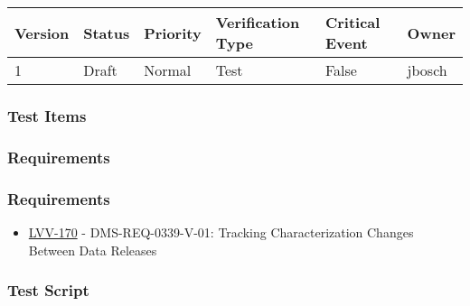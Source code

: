 \begin{longtable}[]{@{}llllll@{}}
\toprule
Version & Status & Priority & Verification Type & Critical Event &
Owner\tabularnewline
\midrule
\endhead
1 & Draft & Normal & Test & False & jbosch\tabularnewline
\bottomrule
\end{longtable}

\hypertarget{test-items-35}{%
\subsubsection{Test Items}\label{test-items-35}}

\hypertarget{requirements-70}{%
\subsubsection{Requirements}\label{requirements-70}}

\hypertarget{requirements-71}{%
\subsubsection{Requirements}\label{requirements-71}}

\begin{itemize}
\tightlist
\item
  \href{https://jira.lsstcorp.org/browse/LVV-170}{LVV-170} -
  DMS-REQ-0339-V-01: Tracking Characterization Changes Between Data
  Releases
\end{itemize}

\hypertarget{test-script-35}{%
\subsubsection{Test Script}\label{test-script-35}}


